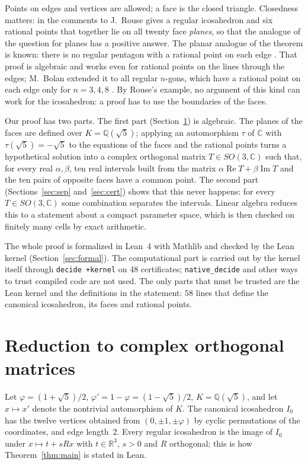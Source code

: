 \documentclass[11pt]{article}
\theoremstyle{definition}
\theoremstyle{remark}
\newcommand{\R}{\mathbb{R}}
\newcommand{\Q}{\mathbb{Q}}
\newcommand{\C}{\mathbb{C}}
\newcommand{\re}{\operatorname{Re}}
\newcommand{\im}{\operatorname{Im}}
\begin{document}
Points on edges and vertices are allowed; a face is the closed triangle. Closedness matters: in the
comments to \cite{Bogdanov} J.~Rouse gives a regular icosahedron and six rational points that
together lie on all twenty face \emph{planes}, so that the analogue of the question for planes has a
positive answer. The planar analogue of the theorem is known: there is no regular pentagon with a
rational point on each edge \cite{Pentagon}. That proof is algebraic and works even for rational
points on the lines through the edges; M.~Bolan extended it to all regular $n$-gons, which have a
rational point on each edge only for $n=3,4,8$ \cite{Pentagon}. By Rouse's example, no argument
of this kind can work for the icosahedron: a proof has to use the boundaries of the faces.

Our proof has two parts. The first part (Section~\ref{sec:red}) is algebraic. The planes of the faces are
defined over $K=\Q(\sqrt5)$; applying an automorphism $\tau$ of $\C$ with $\tau(\sqrt5)=-\sqrt5$ to the
equations of the faces and the rational points turns a hypothetical solution into a complex
orthogonal matrix $T\in SO(3,\C)$ such that, for every real $\alpha,\beta$, ten real intervals built
from the matrix $\alpha\re T+\beta\im T$ and the ten pairs of opposite faces have a common point.
The second part (Sections~\ref{sec:sep} and~\ref{sec:cert}) shows that this never happens: for every
$T\in SO(3,\C)$ some combination separates the intervals. Linear algebra reduces this to a statement
about a compact parameter space, which is then checked on finitely many cells by exact arithmetic.

The whole proof is formalized in Lean~4 \cite{Lean4} with Mathlib \cite{Mathlib} and checked by the
Lean kernel (Section~\ref{sec:formal}). The computational part is carried out by the kernel itself
through \texttt{decide +kernel} on $48$ certificates; \texttt{native\_decide} and other ways to trust
compiled code are not used. The only parts that must be trusted are the Lean kernel and the definitions
in the statement: $58$ lines that define the canonical icosahedron, its faces and rational points.

\section{Reduction to complex orthogonal matrices}\label{sec:red}

Let $\varphi=(1+\sqrt5)/2$, $\varphi'=1-\varphi=(1-\sqrt5)/2$, $K=\Q(\sqrt5)$, and let $x\mapsto x'$
denote the nontrivial automorphism of $K$. The canonical icosahedron $I_0$ has the twelve
vertices obtained from $(0,\pm1,\pm\varphi)$ by cyclic permutations of the coordinates, and edge
length~$2$. Every regular icosahedron is the image of $I_0$ under $x\mapsto t+sRx$ with $t\in\R^3$,
$s>0$ and $R$ orthogonal; this is how Theorem~\ref{thm:main} is stated in Lean.
\end{document}
